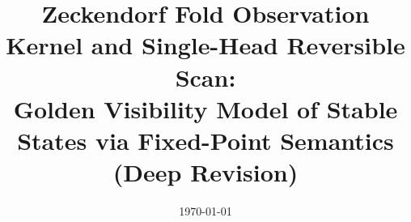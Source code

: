 \documentclass[11pt,letterpaper]{article}
\title{Zeckendorf Fold Observation Kernel and Single-Head Reversible Scan:\\\large Golden Visibility Model of Stable States via Fixed-Point Semantics (Deep Revision)}
\author{}
\date{\today}
\begin{document}
\maketitle















\FloatBarrier
\appendix






\end{document}
